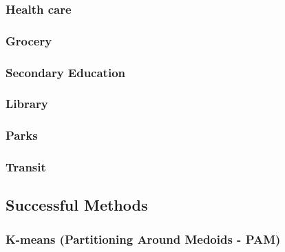 \documentclass[11pt, a4paper]{article}
\begin{document}
\subsubsection{Health care}




\subsubsection{Grocery}




\subsubsection{Secondary Education}




\subsubsection{Library}




\subsubsection{Parks}




\subsubsection{Transit}












\subsection{Successful Methods}\label{appendix:successful}


\subsubsection{K-means (Partitioning Around Medoids - PAM)}
\end{document}
